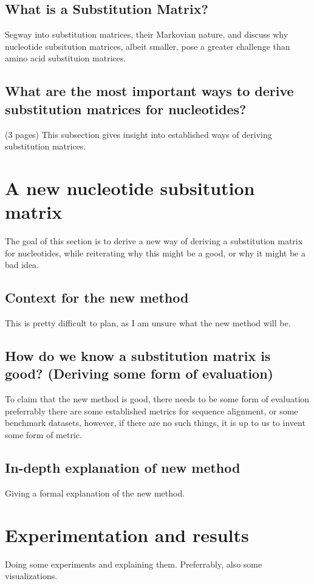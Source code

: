 \documentclass{article}
\begin{document}
\subsection{What is a Substitution Matrix?}
Segway into substitution matrices, their Markovian nature, and discuss why nucleotide subsitution matrices,
albeit smaller, pose a greater challenge than amino acid substituion matrices.
%
%
%
\subsection{What are the most important ways to derive substitution matrices for nucleotides?}
(3 pages)
This subsection gives insight into established ways of deriving substitution matrices.
%
%
%
\section{A new nucleotide subsitution matrix}
The goal of this section is to derive a new way of deriving a substitution matrix for
nucleotides, while reiterating why this might be a good, or why it might be a bad idea.
%
%
%
\subsection{Context for the new method}
This is pretty difficult to plan, as I am unsure what the new method will be.
%
%
%
\subsection{How do we know a substitution matrix is good? (Deriving some form of evaluation)}
To claim that the new method is good, there needs to be some form of evaluation \- preferrably
there are some established metrics for sequence alignment, or some benchmark datasets, however,
if there are no such things, it is up to us to invent some form of metric.
%
%
%
\subsection{In-depth explanation of new method}
Giving a formal explanation of the new method.
%
%
%
\section{Experimentation and results}
Doing some experiments and explaining them. Preferrably, also some visualizations.
\end{document}
